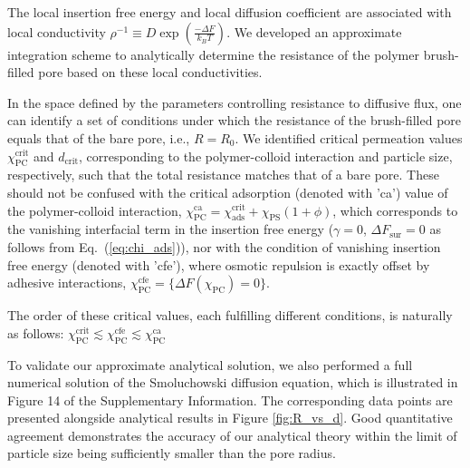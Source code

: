 \documentclass[12pt, a4paper]{article}
\begin{document}
The local insertion free energy and local diffusion coefficient are associated with local conductivity $\rho^{-1}\equiv D \exp\left(\frac{-\Delta F}{k_B T}\right)$.
We developed an approximate integration scheme to analytically determine the resistance of the polymer brush-filled pore based on these local conductivities.

In the space defined by the parameters controlling resistance to diffusive flux, one can identify a set of conditions under which the resistance of the brush-filled pore equals that of the bare pore, i.e., $R = R_{0}$.
We identified critical permeation values $\chi^{\text{crit}}_{\text{PC}}$ and $d_{\text{crit}}$, corresponding to the polymer-colloid interaction and particle size, respectively, such that the total resistance matches that of a bare pore.
These should not be confused with the critical adsorption (denoted with 'ca') value of the polymer-colloid interaction, $\chi^{\text{ca}}_{\text{PC}} = \chi_{\text{ads}}^{\text{crit}} + \chi_{\text{PS}}(1 + \phi)$, which corresponds to the vanishing interfacial term in the insertion free energy ($\gamma = 0$, $\Delta F_{\text{sur}} = 0$ as follows from Eq.~(\ref{eq:chi_ads})), nor with the condition of vanishing insertion free energy (denoted with 'cfe'), where osmotic repulsion is exactly offset by adhesive interactions, $\chi^{\text{cfe}}_{\text{PC}} = \{\Delta F (\chi_{\text{PC}}) = 0\}$.

The order of these critical values, each fulfilling different conditions, is naturally as follows:
$\chi^{\text{crit}}_{\text{PC}} \lesssim \chi^{\text{cfe}}_{\text{PC}} \lesssim \chi^{\text{ca}}_{\text{PC}}$
 
To validate our approximate analytical solution, we also performed a full numerical solution of the Smoluchowski diffusion equation, which is illustrated in 
Figure 14 of the Supplementary Information.
The corresponding data points are presented alongside analytical results in Figure \ref{fig:R_vs_d}.
Good quantitative agreement demonstrates the accuracy of our analytical theory within the limit of particle size being sufficiently smaller than the pore radius.
\end{document}
